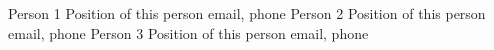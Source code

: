 


\begin{cvrefs}

    \cvref
    {Person 1} %
    {Position of this person}
    {email, phone} %
    \cvref
    {Person 2} %
    {Position of this person}
    {email, phone} %
    \cvref
    {Person 3} %
    {Position of this person}
    {email, phone} %

\end{cvrefs} 